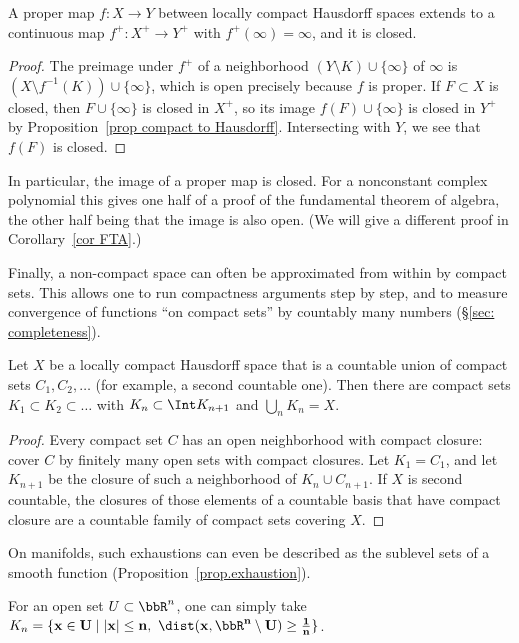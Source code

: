 \begin{prop}\label{prop proper closed}
    A proper map $f:X\to Y$ between locally compact Hausdorff spaces extends to a continuous map $f^+:X^+\to Y^+$ with $f^+(\infty)=\infty$, and it is closed.
\end{prop}
\begin{proof}
    The preimage under $f^+$ of a neighborhood $(Y\setminus K)\cup\{\infty\}$ of $\infty$ is $(X\setminus f^{-1}(K))\cup\{\infty\}$, which is open precisely because $f$ is proper. If $F\subset X$ is closed, then $F\cup\{\infty\}$ is closed in $X^+$, so its image $f(F)\cup\{\infty\}$ is closed in $Y^+$ by Proposition~\ref{prop compact to Hausdorff}. Intersecting with $Y$, we see that $f(F)$ is closed.
\end{proof}

In particular, the image of a proper map is closed. For a nonconstant complex polynomial this gives one half of a proof of the fundamental theorem of algebra, the other half being that the image is also open. (We will give a different proof in Corollary~\ref{cor FTA}.)

Finally, a non-compact space can often be approximated from within by compact sets. This allows one to run compactness arguments step by step, and to measure convergence of functions ``on compact sets'' by countably many numbers (\S\ref{sec: completeness}).

\begin{prop}\label{prop compact exhaustion}
    Let $X$ be a locally compact Hausdorff space that is a countable union of compact sets $C_1,C_2,\ldots$ (for example, a second countable one). Then there are compact sets $K_1\subset K_2\subset\ldots$ with $K_n\subset\Int K_{n+1}$ and $\bigcup_nK_n=X$.
\end{prop}
\begin{proof}
    Every compact set $C$ has an open neighborhood with compact closure: cover $C$ by finitely many open sets with compact closures. Let $K_1=C_1$, and let $K_{n+1}$ be the closure of such a neighborhood of $K_n\cup C_{n+1}$. If $X$ is second countable, the closures of those elements of a countable basis that have compact closure are a countable family of compact sets covering $X$.
\end{proof}
On manifolds, such exhaustions can even be described as the sublevel sets of a smooth function (Proposition~\ref{prop.exhaustion}).

For an open set $U\subset\bbR^n$, one can simply take $K_n=\{\bf{x}\in U\mid\lvert \bf{x}\rvert\leq n,\ \dist(\bf{x},\bbR^n\setminus U)\geq\frac1n\}$.

